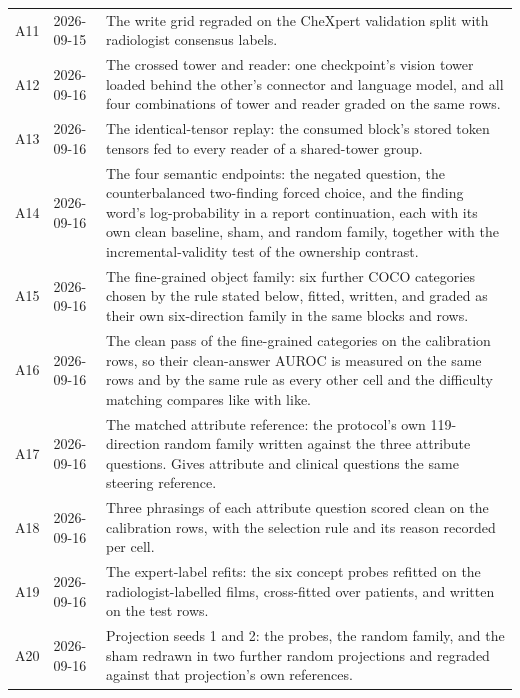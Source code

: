 \documentclass{article}
\providecommand{\DIFdelend}{} %
\DeclareRobustCommand{\DIFdelend}{\DIFOaddend \let\includegraphics\DIFOincludegraphics} %
\begin{document}
\begin{table}[htbp]
{{{\begin{tabular}{ll>{\raggedright\arraybackslash}p{}}
A11 & 2026-09-15 & The write grid regraded on the CheXpert validation split with radiologist consensus labels. \\
A12 & 2026-09-16 & The crossed tower and reader: one checkpoint's vision tower loaded behind the other's connector and language model, and all four combinations of tower and reader graded on the same rows. \\
A13 & 2026-09-16 & The identical-tensor replay: the consumed block's stored token tensors fed to every reader of a shared-tower group. \\
A14 & 2026-09-16 & The four semantic endpoints: the negated question, the counterbalanced two-finding forced choice, and the finding word's log-probability in a report continuation, each with its own clean baseline, sham, and random family, together with the incremental-validity test of the ownership contrast. \\
A15 & 2026-09-16 & The fine-grained object family: six further COCO categories chosen by the rule stated below, fitted, written, and graded as their own six-direction family in the same blocks and rows. \\
A16 & 2026-09-16 & The clean pass of the fine-grained categories on the calibration rows, so their clean-answer AUROC is measured on the same rows and by the same rule as every other cell and the difficulty matching compares like with like. \\
A17 & 2026-09-16 & The matched attribute reference: the protocol's own 119-direction random family written against the three attribute questions. Gives attribute and clinical questions the same steering reference. \\
A18 & 2026-09-16 & Three phrasings of each attribute question scored clean on the calibration rows, with the selection rule and its reason recorded per cell. \\
A19 & 2026-09-16 & The expert-label refits: the six concept probes refitted on the radiologist-labelled films, cross-fitted over patients, and written on the test rows. \\
A20 & 2026-09-16 & Projection seeds 1 and 2: the probes, the random family, and the sham redrawn in two further random projections and regraded against that projection's own references. \\
\bottomrule
\end{tabular}}}
}
\end{table}

\DIFdelend \FloatBarrier
\end{document}
